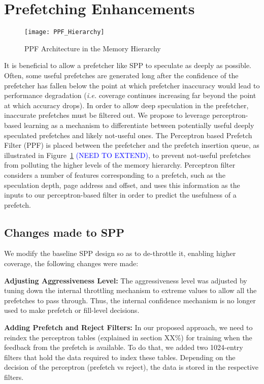 \section{Prefetching Enhancements}
\label{Enhancements}

\begin{figure}
  \begin{center}
  \texttt{[image: PPF\_Hierarchy]}
  \caption{PPF Architecture in the Memory Hierarchy}
  \label{fig:PPF_Hierarchy}
  \end{center}
\end{figure}

It is beneficial to allow a prefetcher like SPP to speculate as deeply
as possible. Often, some useful prefetches are generated long after
the confidence of the prefetcher has fallen below the point at which
prefetcher inaccuracy would lead to performance degradation
(\emph{i.e.} coverage continues increasing far beyond the point at
which accuracy drops).  In order to allow deep speculation in the
prefetcher, inaccurate prefetches must be filtered out. We propose to
leverage perceptron-based learning as a mechanism to differentiate
between potentially useful deeply speculated prefetches and likely
not-useful ones. The Perceptron based Prefetch Filter (PPF) is placed
between the prefetcher and the prefetch insertion queue, as
illustrated in Figure~\ref{fig:PPF_Hierarchy} \textcolor{blue}{(NEED
  TO EXTEND)}, to prevent not-useful prefetches from polluting the
higher levels of the memory hierarchy. Perceptron filter considers a
number of features corresponding to a prefetch, such as the
speculation depth, page address and offset, and uses this information
as the inputs to our perceptron-based filter in order to predict the
usefulness of a prefetch.

\subsection{Changes made to SPP}
\label{Enhancements-SPP}
We modify the baseline SPP design so as to de-throttle it, enabling
higher coverage, the following changes were made:

\noindent \textbf{Adjusting Aggressiveness Level:} The aggressiveness
level was adjusted by tuning down the internal throttling mechanism to
extreme values to allow all the prefetches to pass through. Thus, the
internal confidence mechanism is no longer used to make prefetch or
fill-level decisions.

\noindent \textbf{Adding Prefetch and Reject Filters:} In our proposed
approach, we need to reindex the perceptron tables (explained in
section XX\%) for training when the feedback from the prefetch is
available.  To do that, we added two 1024-entry filters that hold the
data required to index these tables. Depending on the decision of the
perceptron (prefetch vs reject), the data is stored in the respective
filters.

